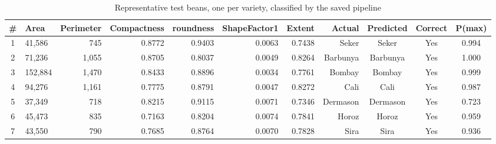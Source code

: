 \begin{table}[htbp]
\centering
\scriptsize
\caption{Representative test beans, one per variety, classified by the saved pipeline}
\label{tab:sample_predictions}
\begin{tabular}{clrrrrrrccc}
\toprule
\# & Area & Perimeter & Compactness & roundness & ShapeFactor1 & Extent & Actual & Predicted & Correct & P(max) \\
\midrule
1 & 41,586 & 745 & 0.8772 & 0.9403 & 0.0063 & 0.7438 & Seker & Seker & Yes & 0.994 \\
2 & 71,236 & 1,055 & 0.8705 & 0.8037 & 0.0049 & 0.8264 & Barbunya & Barbunya & Yes & 1.000 \\
3 & 152,884 & 1,470 & 0.8433 & 0.8896 & 0.0034 & 0.7761 & Bombay & Bombay & Yes & 0.999 \\
4 & 94,276 & 1,161 & 0.7775 & 0.8791 & 0.0047 & 0.8272 & Cali & Cali & Yes & 0.987 \\
5 & 37,349 & 718 & 0.8215 & 0.9115 & 0.0071 & 0.7346 & Dermason & Dermason & Yes & 0.723 \\
6 & 45,473 & 835 & 0.7163 & 0.8204 & 0.0074 & 0.7841 & Horoz & Horoz & Yes & 0.959 \\
7 & 43,550 & 790 & 0.7685 & 0.8764 & 0.0070 & 0.7828 & Sira & Sira & Yes & 0.936 \\
\bottomrule
\end{tabular}
\end{table}

